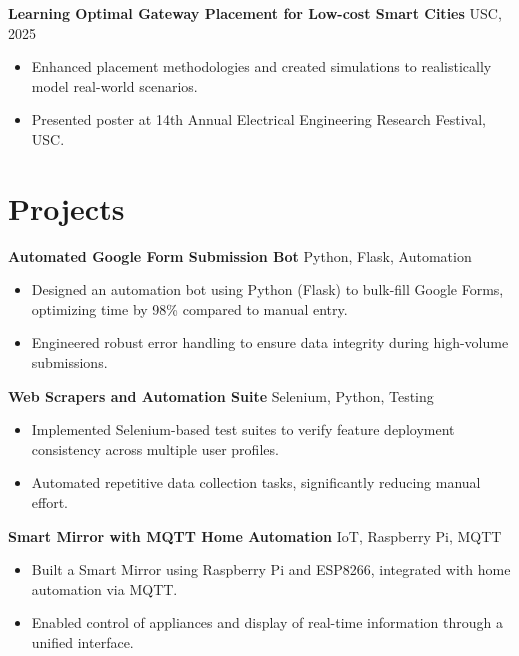 \documentclass[letterpaper,10pt]{article}
\begin{document}
    \vspace{-2pt}
    \textbf{Learning Optimal Gateway Placement for Low-cost Smart Cities} \hfill USC, 2025
    \begin{itemize}[leftmargin=*]
        \item Enhanced placement methodologies and created simulations to realistically model real-world scenarios.
        \item Presented poster at 14th Annual Electrical Engineering Research Festival, USC.
    \end{itemize}

\section*{Projects}
    \textbf{Automated Google Form Submission Bot} \hfill Python, Flask, Automation
    \begin{itemize}[leftmargin=*]
        \item Designed an automation bot using Python (Flask) to bulk-fill Google Forms, optimizing time by 98\% compared to manual entry.
        \item Engineered robust error handling to ensure data integrity during high-volume submissions.
    \end{itemize}

    \vspace{-2pt}
    \textbf{Web Scrapers and Automation Suite} \hfill Selenium, Python, Testing
    \begin{itemize}[leftmargin=*]
        \item Implemented Selenium-based test suites to verify feature deployment consistency across multiple user profiles.
        \item Automated repetitive data collection tasks, significantly reducing manual effort.
    \end{itemize}

    \vspace{-2pt}
    \textbf{Smart Mirror with MQTT Home Automation} \hfill IoT, Raspberry Pi, MQTT
    \begin{itemize}[leftmargin=*]
        \item Built a Smart Mirror using Raspberry Pi and ESP8266, integrated with home automation via MQTT.
        \item Enabled control of appliances and display of real-time information through a unified interface.
    \end{itemize}
\end{document}
